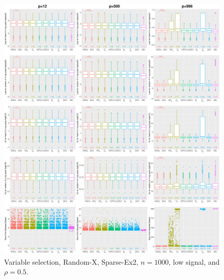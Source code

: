 \begin{figure}[!ht]
\centering
\includegraphics[width=\textwidth]{figures/supplement/randomx/subset_selection/Sparse-Ex2_n1000_lsnr_rho05.eps}
\caption{Variable selection, Random-X, Sparse-Ex2, $n=1000$, low signal, and $\rho=0.5$.}
\end{figure}
\clearpage
